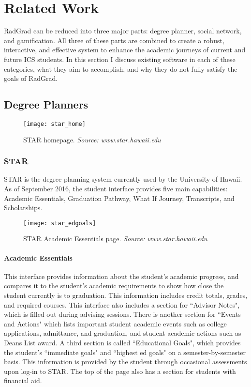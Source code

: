 \chapter{Related Work}
RadGrad can be reduced into three major parts: degree planner, social network, and gamification. All three of these parts are combined to create a robust, interactive, and effective system to enhance the academic journeys of current and future ICS students. In this section I discuss existing software in each of these categories, what they aim to accomplish, and why they do not fully satisfy the goals of RadGrad.

\section{Degree Planners}
\begin{figure}[h]
\centering
\texttt{[image: star\_home]}
\caption{STAR homepage. \textit{Source: www.star.hawaii.edu}}
\end{figure}
\subsection{STAR}
STAR is the degree planning system currently used by the University of Hawaii. As of September 2016, the student interface provides five main capabilities: Academic Essentials, Graduation Pathway, What If Journey, Transcripts, and Scholarships. 

\begin{figure}[h]
\centering
\texttt{[image: star\_edgoals]}
\caption{STAR Academic Essentials page. \textit{Source: www.star.hawaii.edu}}
\end{figure}
\subsubsection{Academic Essentials}
This interface provides information about the student's academic progress, and compares it to the student's academic requirements to show how close the student currently is to graduation. This information includes credit totals, grades, and required courses. This interface also includes a section for ``Advisor Notes", which is filled out during advising sessions. There is another section for ``Events and Actions" which lists important student academic events such as college applications, admittance, and graduation, and student academic actions such as Deans List award. A third section is called ``Educational Goals", which provides the student's ``immediate goals" and ``highest ed goals" on a semester-by-semester basis. This information is provided by the student through occasional assessments upon log-in to STAR. The top of the page also has a section for students with financial aid.

